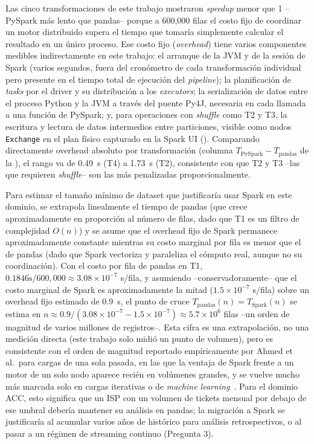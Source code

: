 \documentclass[11pt,a4paper]{article}
\begin{document}
    Las cinco transformaciones de este trabajo mostraron \emph{speedup} menor que 1 --PySpark más
    lento que pandas-- porque a 600{,}000 filas el costo fijo de coordinar un motor distribuido
    supera el tiempo que tomaría simplemente calcular el resultado en un único proceso. Ese costo
    fijo (\emph{overhead}) tiene varios componentes medibles indirectamente en este trabajo: el
    arranque de la JVM y de la sesión de Spark (varios segundos, fuera del cronómetro de cada
    transformación individual pero presente en el tiempo total de ejecución del \emph{pipeline});
    la planificación de \emph{tasks} por el driver y su distribución a los \emph{executors}; la
    serialización de datos entre el proceso Python y la JVM a través del puente Py4J, necesaria en
    cada llamada a una función de PySpark; y, para operaciones con \emph{shuffle} como T2 y T3, la
    escritura y lectura de datos intermedios entre particiones, visible como nodos
    \texttt{Exchange} en el plan físico capturado en la Spark UI (). Comparando
    directamente overhead absoluto por transformación (columna $T_{\text{PySpark}} -
    T_{\text{pandas}}$ de la ), el rango va de \SI{0.49}{\second} (T4) a
    \SI{1.73}{\second} (T2), consistente con que T2 y T3 --las que requieren \emph{shuffle}-- son
    las más penalizadas proporcionalmente.

    Para estimar el tamaño mínimo de dataset que justificaría usar Spark en este dominio, se
    extrapola linealmente el tiempo de pandas (que crece aproximadamente en proporción al número de
    filas, dado que T1 es un filtro de complejidad $O(n)$) y se asume que el overhead fijo de Spark
    permanece aproximadamente constante mientras su costo marginal por fila es menor que el de
    pandas (dado que Spark vectoriza y paraleliza el cómputo real, aunque no su coordinación). Con
    el costo por fila de pandas en T1, $0.1846\text{s}/600{,}000 \approx 3.08\times10^{-7}$
    s/fila, y asumiendo --conservadoramente-- que el costo marginal de Spark es aproximadamente la
    mitad ($1.5\times10^{-7}$ s/fila) sobre un overhead fijo estimado de \SI{0.9}{\second}, el punto
    de cruce $T_{\text{pandas}}(n) = T_{\text{Spark}}(n)$ se estima en
    $n \approx 0.9 / (3.08\times10^{-7} - 1.5\times10^{-7}) \approx 5.7 \times 10^6$ filas --un
    orden de magnitud de varios millones de registros--. Esta cifra es una extrapolación, no una
    medición directa (este trabajo solo midió un punto de volumen), pero es consistente con el
    orden de magnitud reportado empíricamente por Ahmed et al.\ para cargas de una sola pasada, en
    las que la ventaja de Spark frente a un motor de un solo nodo aparece recién en volúmenes
    grandes, y se vuelve mucho más marcada solo en cargas iterativas o de
    \emph{machine learning}~\autocite{ahmed2020}. Para el dominio ACC, esto significa
    que un ISP con un volumen de tickets mensual por debajo de ese umbral debería mantener su
    análisis en pandas; la migración a Spark se justificaría al acumular varios años de histórico
    para análisis retrospectivos, o al pasar a un régimen de streaming continuo (Pregunta 3).
\end{document}
